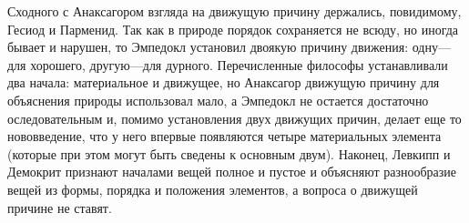 \documentclass{article}
\begin{document}
Сходного с Анаксагором взгляда на движущую причину держались, повидимому, Гесиод и Парменид. Так как в природе порядок сохраняется не всюду, но иногда бывает и нарушен, то Эмпедокл установил двоякую причину движения: одну—для хорошего, другую—для дурного. Перечисленные философы устанавливали два начала: материальное и движущее, но Анаксагор движущую причину для объяснения природы использовал мало, а Эмпедокл не остается достаточно оследовательным и, помимо установления двух движущих причин, делает еще то нововведение, что у него впервые появляются четыре материальных элемента (которые при этом могут быть сведены к основным двум). Наконец, Левкипп и Демокрит признают началами вещей полное и пустое и объясняют разнообразие вещей из формы, порядка и положения элементов, а вопроса о движущей причине не ставят.
\end{document}
